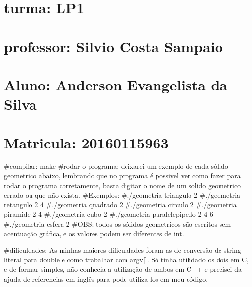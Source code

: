 \section*{turma\+: L\+P1}

\section*{professor\+: Silvio Costa Sampaio}

\section*{Aluno\+: Anderson Evangelista da Silva}

\section*{Matricula\+: 20160115963}

\#compilar\+: make \#rodar o programa\+: deixarei um exemplo de cada sólido geometrico abaixo, lembrando que no programa é possivel ver como fazer para rodar o programa corretamente, basta digitar o nome de um solido geometrico errado ou que não exista. \#\+Exemplos\+: \#./geometria triangulo 2 \#./geometria retangulo 2 4 \#./geometria quadrado 2 \#./geometria circulo 2 \#./geometria piramide 2 4 \#./geometria cubo 2 \#./geometria paralelepipedo 2 4 6 \#./geometria esfera 2 \#\+O\+BS\+: todos os sólidos geometricos são escritos sem acentuação gráfica, e os valores podem ser diferentes de int.

\#dificuldades\+: As minhas maiores dificuldades foram as de conversão de string literal para double e como trabalhar com argv\mbox{[}\mbox{]}. Só tinha utilidado os dois em C, e de formar simples, não conhecia a utilização de ambos em C++ e precisei da ajuda de referencias em inglês para pode utiliza-\/los em meu código. 